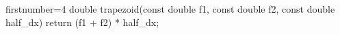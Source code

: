 \begin{cppcode*}{firstnumber=4}
double trapezoid(const double f1, const double f2, 
  const double half_dx) 
{
  return (f1 + f2) * half_dx;
}
\end{cppcode*}
